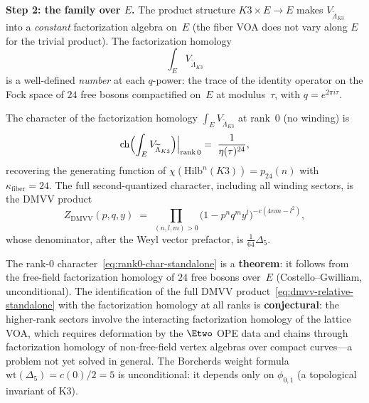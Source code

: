 \medskip
\noindent\textbf{Step 2: the family over $E$.}  The product structure
$K3 \times E \to E$ makes $V_{\widetilde{\Lambda}_{K3}}$ into a
\emph{constant} factorization algebra on~$E$ (the fiber VOA does not
vary along $E$ for the trivial product).  The factorization homology
\begin{equation}\label{eq:fact-hom-over-e-standalone}
  \int_E V_{\widetilde{\Lambda}_{K3}}
\end{equation}
is a well-defined \emph{number} at each $q$-power: the trace of the
identity operator on the Fock space of $24$ free bosons compactified
on~$E$ at modulus~$\tau$, with $q = e^{2\pi i\tau}$.

\begin{conjecture}
\label{conj:relative-fact-hom-char-standalone}
\ClaimStatusConjectured
The character of the factorization homology
$\int_E V_{\widetilde{\Lambda}_{K3}}$ at rank~$0$ (no winding) is
\begin{equation}\label{eq:rank0-char-standalone}
  \operatorname{ch}\Bigl(\int_E V_{\widetilde{\Lambda}_{K3}}\Bigr)
  \Bigl|_{\mathrm{rank}\,0}
  \;=\;
  \frac{1}{\eta(\tau)^{24}},
\end{equation}
recovering the generating function of $\chi(\mathrm{Hilb}^n(K3)) = p_{24}(n)$
with $\kappa_{\mathrm{fiber}} = 24$.  The full second-quantized character,
including all winding sectors, is the DMVV product
\begin{equation}\label{eq:dmvv-relative-standalone}
  Z_{\mathrm{DMVV}}(p, q, y)
  \;=\;
  \prod_{(n,l,m) > 0}
  \bigl(1 - p^n q^m y^l\bigr)^{-c(4nm - l^2)},
\end{equation}
whose denominator, after the Weyl vector prefactor, is
$\frac{1}{64}\Delta_5$.
\end{conjecture}

\begin{remark}
\label{rem:relative-scope-standalone}
The rank-$0$ character~\eqref{eq:rank0-char-standalone} is a
\textbf{theorem}: it follows from the free-field factorization
homology of $24$ free bosons over~$E$ (Costello--Gwilliam,
unconditional).  The identification of the full DMVV
product~\eqref{eq:dmvv-relative-standalone} with the factorization
homology at all ranks is \textbf{conjectural}: the higher-rank
sectors involve the interacting factorization homology of the lattice
VOA, which requires deformation by the $\Etwo$ OPE data and chains
through factorization homology of non-free-field vertex algebras over
compact curves---a problem not yet solved in general.  The Borcherds
weight formula $\mathrm{wt}(\Delta_5) = c(0)/2 = 5$ is
unconditional: it depends only on $\phi_{0,1}$ (a topological
invariant of K3).
\end{remark}

